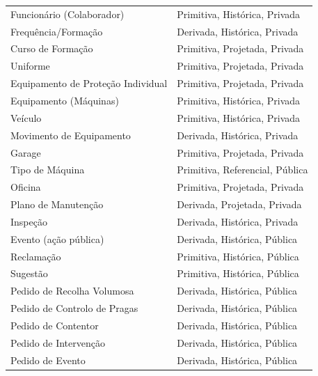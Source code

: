 \documentclass[12pt,a4paper,final]{article}
\begin{document}
\begin{longtable}{|p{6cm}|p{7cm}|}
        Funcionário (Colaborador)                & Primitiva, Histórica, Privada   \\
        Frequência/Formação                      & Derivada, Histórica, Privada    \\
        Curso de Formação                        & Primitiva, Projetada, Privada   \\
        Uniforme                                 & Primitiva, Projetada, Privada   \\
        Equipamento de Proteção Individual       & Primitiva, Projetada, Privada   \\
        Equipamento (Máquinas)                   & Primitiva, Histórica, Privada   \\
        Veículo                                  & Primitiva, Histórica, Privada   \\
        Movimento de Equipamento                 & Derivada, Histórica, Privada    \\
        Garage                                   & Primitiva, Projetada, Privada   \\
        Tipo de Máquina                          & Primitiva, Referencial, Pública \\
        Oficina                                  & Primitiva, Projetada, Privada   \\
        Plano de Manutenção                      & Derivada, Projetada, Privada    \\
        Inspeção                                 & Derivada, Histórica, Privada    \\
        Evento (ação pública)                    & Derivada, Histórica, Pública    \\
        Reclamação                               & Primitiva, Histórica, Pública   \\
        Sugestão                                 & Primitiva, Histórica, Pública   \\
        Pedido de Recolha Volumosa               & Derivada, Histórica, Pública    \\
        Pedido de Controlo de Pragas             & Derivada, Histórica, Pública    \\
        Pedido de Contentor                      & Derivada, Histórica, Pública    \\
        Pedido de Intervenção                    & Derivada, Histórica, Pública    \\
        Pedido de Evento                         & Derivada, Histórica, Pública    \\

\end{longtable}
\end{document}
